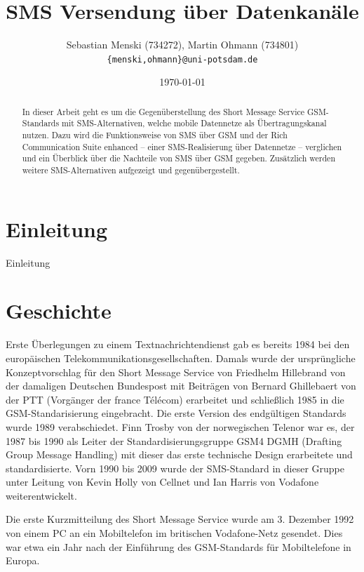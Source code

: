 \documentclass[german,12pt,a4paper]{article}
\begin{document}
\title{\textbf{SMS Versendung über Datenkanäle}}
\author{Sebastian Menski (734272), Martin Ohmann (734801) \\ \texttt{\{menski,ohmann\}@uni-potsdam.de}}
\date{\today}

\maketitle

\begin{abstract}
In dieser Arbeit geht es um die Gegenüberstellung des Short Message Service 
GSM-Standards mit SMS-Alternativen, welche mobile Datennetze als Übertragungskanal 
nutzen. Dazu wird die Funktionsweise von SMS über GSM und der Rich Communication Suite enhanced 
-- einer SMS-Realisierung über Datennetze -- verglichen und ein Überblick über die Nachteile 
von SMS über GSM gegeben. Zusätzlich werden weitere SMS-Alternativen aufgezeigt und gegenübergestellt.
\end{abstract}

\section{Einleitung}
Einleitung

\section{Geschichte}
Erste Überlegungen zu einem Textnachrichtendienst gab es bereits 1984 bei den 
europäischen Telekommunikationsgesellschaften. Damals wurde der ursprüngliche 
Konzeptvorschlag für den Short Message Service von Friedhelm Hillebrand von der 
damaligen Deutschen Bundespost mit Beiträgen von Bernard Ghillebaert von der PTT 
(Vorgänger der france Télécom) erarbeitet und schließlich 1985 in die 
GSM-Standarisierung eingebracht. Die erste Version des endgültigen Standards 
wurde 1989 verabschiedet. Finn Trosby von der norwegischen Telenor war es, der 
1987 bis 1990 als Leiter der Standardisierungsgruppe GSM4 DGMH (Drafting Group 
Message Handling) mit dieser das erste technische Design erarbeitete und 
standardisierte.
Vorn 1990 bis 2009 wurde der SMS-Standard in dieser Gruppe unter Leitung von 
Kevin Holly von Cellnet und Ian Harris von Vodafone weiterentwickelt\cite{wikipedia:sms}.

Die erste Kurzmitteilung des Short Message Service wurde am 3. Dezember 1992 
von einem PC an ein Mobiltelefon im britischen Vodafone-Netz gesendet. Dies 
war etwa ein Jahr nach der Einführung des GSM-Standards für Mobiltelefone in 
Europa.
\end{document}
